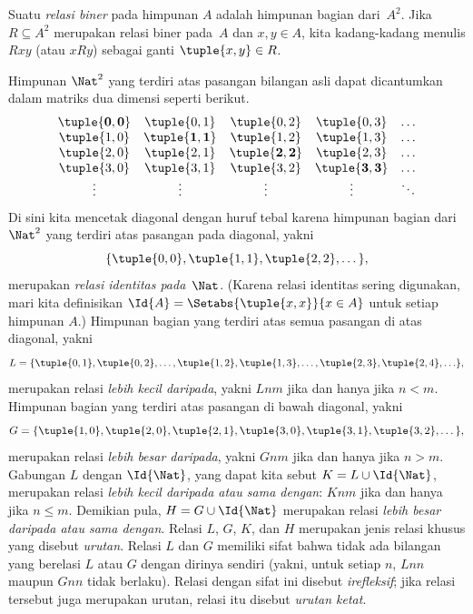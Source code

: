 \documentclass[../../../include/open-logic-section]{subfiles}
\begin{document}
\begin{defn}
Suatu \emph{relasi biner} pada himpunan $A$ adalah himpunan bagian
dari~$A^{2}$. Jika $R \subseteq A^{2}$ merupakan relasi biner pada~$A$ dan
$x, y \in A$, kita kadang-kadang menulis $Rxy$ (atau $xRy$) sebagai ganti
$\tuple{x, y} \in R$.
\end{defn}

\begin{ex}
Himpunan $\Nat^{2}$ yang terdiri atas pasangan bilangan asli dapat dicantumkan
dalam matriks dua dimensi seperti berikut.
\[
  \begin{array}{ccccc}
  \mathbf{\tuple{ 0,0 }} & \tuple{ 0,1 } &
    \tuple{ 0,2 } & \tuple{ 0,3 } & \ldots\\
  \tuple{ 1,0 } & \mathbf{\tuple{ 1,1 }} &
    \tuple{ 1,2 } & \tuple{ 1,3 } & \ldots\\
  \tuple{ 2,0 } & \tuple{ 2,1 } &
    \mathbf{\tuple{ 2,2 }} & \tuple{ 2,3 } & \ldots\\
  \tuple{ 3,0 } & \tuple{ 3,1 } & \tuple{ 3,2 } &
    \mathbf{\tuple{ 3,3 }} & \ldots\\
  \vdots & \vdots & \vdots & \vdots & \mathbf{\ddots}
  \end{array}
\]
Di sini kita mencetak diagonal dengan huruf tebal karena himpunan bagian dari
$\Nat^2$ yang terdiri atas pasangan pada diagonal, yakni
\[
  \{\tuple{0,0 }, \tuple{ 1,1 }, \tuple{ 2,2 }, \dots\},
  \]
merupakan \emph{relasi identitas pada}~$\Nat$. (Karena relasi identitas sering
digunakan, mari kita definisikan $\Id{A}=\Setabs{\tuple{ x,x }}{x \in A}$
untuk setiap himpunan $A$.) Himpunan bagian yang terdiri atas
semua pasangan di atas diagonal, yakni
\[
  L = \{\tuple{ 0,1 },\tuple{ 0,2 },\ldots,\tuple{ 1,2 },
  \tuple{ 1,3 }, \dots, \tuple{ 2,3 }, \tuple{ 2,4 },\ldots\},
\]
merupakan relasi \emph{lebih kecil daripada}, yakni $Lnm$ jika dan hanya jika
$n<m$. Himpunan bagian yang terdiri atas pasangan di bawah diagonal, yakni
\[
  G=\{ \tuple{ 1,0 },\tuple{ 2,0 },\tuple{
    2,1 }, \tuple{ 3,0 },\tuple{ 3,1 },\tuple{ 3,2 }, \dots\},
\]
merupakan relasi \emph{lebih besar daripada}, yakni $Gnm$ jika dan hanya jika
$n>m$. Gabungan $L$ dengan $\Id{\Nat}$, yang dapat kita sebut
$K=L\cup \Id{\Nat}$, merupakan
relasi \emph{lebih kecil daripada atau sama dengan}: $Knm$ jika dan hanya jika
$n \le m$. Demikian pula, $H=G \cup \Id{\Nat}$ merupakan relasi \emph{lebih besar
daripada atau sama dengan}. Relasi $L$, $G$, $K$, dan $H$ merupakan jenis
relasi khusus yang disebut \emph{urutan}. Relasi $L$ dan $G$ memiliki sifat
bahwa tidak ada bilangan yang berelasi $L$ atau $G$ dengan dirinya sendiri
(yakni, untuk setiap $n$, $Lnn$ maupun $Gnn$ tidak berlaku). Relasi dengan
sifat ini disebut \emph{irefleksif}; jika relasi tersebut juga merupakan
urutan, relasi itu disebut \emph{urutan ketat}.
\end{ex}
\end{document}
